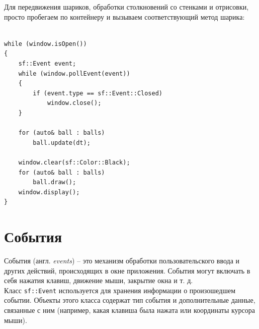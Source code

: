 \documentclass{article}
\begin{document}
Для передвижения шариков, обработки столкновений со стенками и отрисовки, просто пробегаем по контейнеру и вызываем соответствующий метод шарика:
\begin{lstlisting}

while (window.isOpen())
{
    sf::Event event;
    while (window.pollEvent(event)) 
    {
        if (event.type == sf::Event::Closed)
            window.close();
    }

    for (auto& ball : balls)
        ball.update(dt);
    
    window.clear(sf::Color::Black);   
    for (auto& ball : balls)
        ball.draw();
    window.display();
}
\end{lstlisting}


\newpage

\section{События}
События (англ. \textit{events}) -- это механизм обработки пользовательского ввода и других действий, происходящих в окне приложения. События могут включать в себя нажатия клавиш, движение мыши, закрытие окна и т. д. \\
Класс \texttt{sf::Event} используется для хранения информации о произошедшем событии. Объекты этого класса содержат тип события и дополнительные данные, связанные с ним (например, какая клавиша была нажата или координаты курсора мыши).
\end{document}
